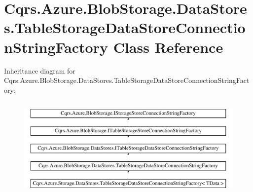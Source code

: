\hypertarget{classCqrs_1_1Azure_1_1BlobStorage_1_1DataStores_1_1TableStorageDataStoreConnectionStringFactory}{}\section{Cqrs.\+Azure.\+Blob\+Storage.\+Data\+Stores.\+Table\+Storage\+Data\+Store\+Connection\+String\+Factory Class Reference}
\label{classCqrs_1_1Azure_1_1BlobStorage_1_1DataStores_1_1TableStorageDataStoreConnectionStringFactory}
Inheritance diagram for Cqrs.\+Azure.\+Blob\+Storage.\+Data\+Stores.\+Table\+Storage\+Data\+Store\+Connection\+String\+Factory\+:\begin{figure}[H]
\begin{center}
\leavevmode
\includegraphics[height=5.000000cm]{classCqrs_1_1Azure_1_1BlobStorage_1_1DataStores_1_1TableStorageDataStoreConnectionStringFactory}
\end{center}
\end{figure}
